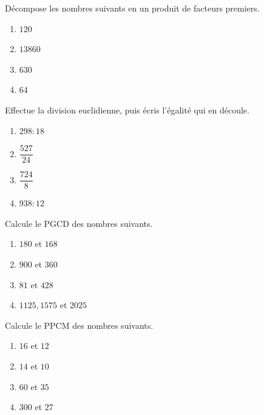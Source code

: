 \documentclass[12pt,parskip=half-, twoside=semi]{scrartcl}
\begin{document}
      \begin{exercise}
        Décompose les nombres suivants en un produit de facteurs premiers.
          \begin{enumerate}[cols=2]
            \item $120$
            \item $13 860$
            \item $630$
            \item $64$
          \end{enumerate}
      \end{exercise}

      \begin{exercise}
        Effectue la division euclidienne, puis écris l'égalité qui en découle. 
          \begin{enumerate}[cols=2]
            \item $298 : 18$
            \item $\dfrac{527}{24} $
            \item $\dfrac{724}{8}$
            \item $938 : 12$
          \end{enumerate}
      \end{exercise}

      \begin{exercise}
        Calcule le PGCD des nombres suivants. 
          \begin{enumerate}[cols=2]
            \item $180$ et $168$
            \item $900$ et $360$
            \item $81$ et $428$
            \item $1125, 1575$ et $2025$
          \end{enumerate}
      \end{exercise}

      \begin{exercise}
        Calcule le PPCM des nombres suivants.
          \begin{enumerate}[cols=2]
            \item $16$ et $12$
            \item $14$ et $10$
            \item $60$ et $35$
            \item $300$ et $27$
          \end{enumerate}
      \end{exercise}
\end{document}

